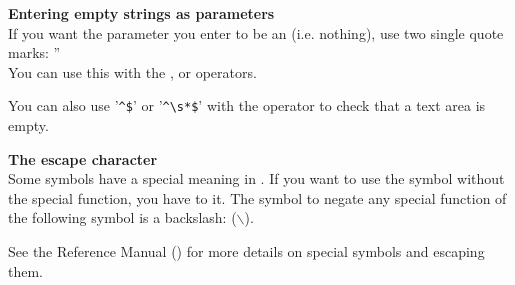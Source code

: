 
\textbf{Entering empty strings as parameters}\\
If you want the parameter you enter to be an  (i.e. nothing), use two single quote marks: ''\\

You can use this with the ,  or  operators.

You can also use '\verb+^$+' or '\verb+^\s*$+' with the operator  to check that a text area is empty.  



\textbf{The escape character}\\
Some symbols have a special meaning in \app{}. If you want to use the symbol without the special function, you have to  it. The symbol to negate any special function of the following symbol is a backslash: ($\backslash$). 
                          
See the Reference Manual () for more details on special symbols and escaping them.


